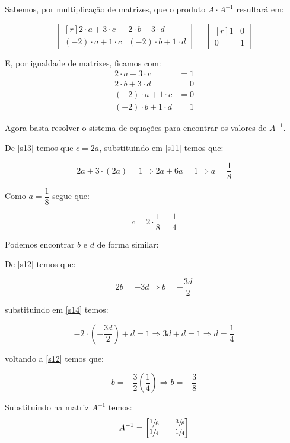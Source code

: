 Sabemos, por multiplicação de matrizes, que o produto $A\cdot A^{-1}$ resultará em:

$$
\begin{bmatrix*}[r]
    2\cdot a + 3\cdot c & 2\cdot b + 3\cdot d\\
    (-2)\cdot a + 1\cdot c & (-2)\cdot b + 1\cdot d
\end{bmatrix*}=\begin{bmatrix*}[r]
    1 & 0\\0 & 1
\end{bmatrix*}
$$

E, por igualdade de matrizes, ficamos com:
\begin{align}
    2\cdot a + 3\cdot c &= 1 \label{s11} \\
    2\cdot b + 3\cdot d &= 0\label{s12}\\
    (-2)\cdot a + 1\cdot c &= 0 \label{s13} \\
    (-2)\cdot b + 1\cdot d &= 1 \label{s14}
\end{align}

Agora basta resolver o sistema de equações para encontrar os valores de $A^{-1}$.

\smallskip

De \ref{s13} temos que $c=2a$, substituindo em \ref{s11} temos que: 

$$2a+3\cdot (2a)=1\Rightarrow 2a+6a=1\Rightarrow a=\frac{1}{8}$$

Como $a=\dfrac{1}{8}$ segue que: 

$$c=2\cdot \frac{1}{8}=\frac{1}{4}$$

Podemos encontrar $b$ e $d$ de forma similar:

\smallskip

De \ref{s12} temos que:

$$2b=-3d\Rightarrow b=-\frac{3d}{2}$$

substituindo em \ref{s14} temos:

$$-2\cdot \left( -\frac{3d}{2} \right) + d=1\Rightarrow 3d+d=1\Rightarrow d=\frac{1}{4}$$
    
voltando a \ref{s12} temos que:

$$b=-\frac{3}{2} \left( \frac{1}{4} \right) \Rightarrow b=-\frac{3}{8}$$

Substituindo na matriz $A^{-1}$  temos:
$$
A^{-1}=
\begin{bmatrix*}[r]
    \sfrac{1}{8} & \sfrac{-3}{8} \\
    \sfrac{1}{4} & \sfrac{1}{4}
\end{bmatrix*}
$$
